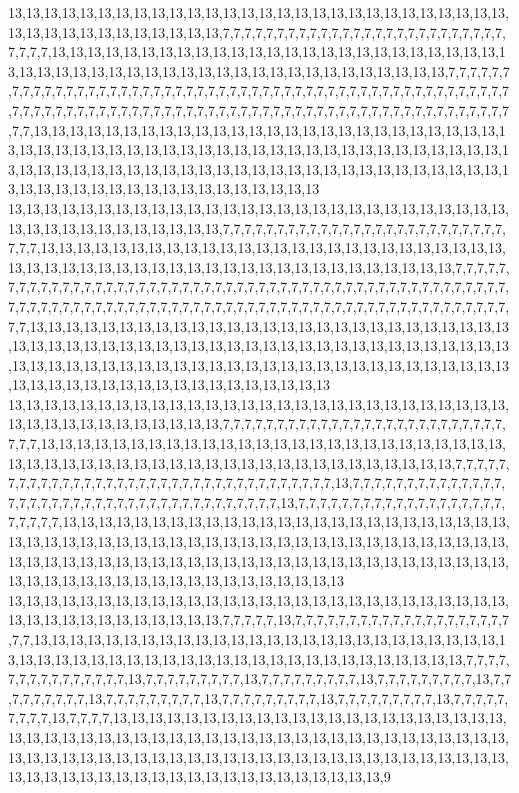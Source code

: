 13,13,13,13,13,13,13,13,13,13,13,13,13,13,13,13,13,13,13,13,13,13,13,13,13,13,13,13,13,13,13,13,13,13,13,13,13,13,13,13,7,7,7,7,7,7,7,7,7,7,7,7,7,7,7,7,7,7,7,7,7,7,7,7,7,7,7,7,7,7,13,13,13,13,13,13,13,13,13,13,13,13,13,13,13,13,13,13,13,13,13,13,13,13,13,13,13,13,13,13,13,13,13,13,13,13,13,13,13,13,13,13,13,13,13,13,13,13,13,13,7,7,7,7,7,7,7,7,7,7,7,7,7,7,7,7,7,7,7,7,7,7,7,7,7,7,7,7,7,7,7,7,7,7,7,7,7,7,7,7,7,7,7,7,7,7,7,7,7,7,7,7,7,7,7,7,7,7,7,7,7,7,7,7,7,7,7,7,7,7,7,7,7,7,7,7,7,7,7,7,7,7,7,7,7,7,7,7,7,7,7,7,7,7,7,7,7,7,7,7,13,13,13,13,13,13,13,13,13,13,13,13,13,13,13,13,13,13,13,13,13,13,13,13,13,13,13,13,13,13,13,13,13,13,13,13,13,13,13,13,13,13,13,13,13,13,13,13,13,13,13,13,13,13,13,13,13,13,13,13,13,13,13,13,13,13,13,13,13,13,13,13,13,13,13,13,13,13,13,13,13,13,13,13,13,13,13,13,13,13,13,13,13,13,13,13,13,13,13,13
13,13,13,13,13,13,13,13,13,13,13,13,13,13,13,13,13,13,13,13,13,13,13,13,13,13,13,13,13,13,13,13,13,13,13,13,13,13,13,13,7,7,7,7,7,7,7,7,7,7,7,7,7,7,7,7,7,7,7,7,7,7,7,7,7,7,7,7,7,13,13,13,13,13,13,13,13,13,13,13,13,13,13,13,13,13,13,13,13,13,13,13,13,13,13,13,13,13,13,13,13,13,13,13,13,13,13,13,13,13,13,13,13,13,13,13,13,13,13,13,7,7,7,7,7,7,7,7,7,7,7,7,7,7,7,7,7,7,7,7,7,7,7,7,7,7,7,7,7,7,7,7,7,7,7,7,7,7,7,7,7,7,7,7,7,7,7,7,7,7,7,7,7,7,7,7,7,7,7,7,7,7,7,7,7,7,7,7,7,7,7,7,7,7,7,7,7,7,7,7,7,7,7,7,7,7,7,7,7,7,7,7,7,7,7,7,7,7,7,13,13,13,13,13,13,13,13,13,13,13,13,13,13,13,13,13,13,13,13,13,13,13,13,13,13,13,13,13,13,13,13,13,13,13,13,13,13,13,13,13,13,13,13,13,13,13,13,13,13,13,13,13,13,13,13,13,13,13,13,13,13,13,13,13,13,13,13,13,13,13,13,13,13,13,13,13,13,13,13,13,13,13,13,13,13,13,13,13,13,13,13,13,13,13,13,13,13,13,13,13
13,13,13,13,13,13,13,13,13,13,13,13,13,13,13,13,13,13,13,13,13,13,13,13,13,13,13,13,13,13,13,13,13,13,13,13,13,13,13,13,7,7,7,7,7,7,7,7,7,7,7,7,7,7,7,7,7,7,7,7,7,7,7,7,7,7,7,7,7,13,13,13,13,13,13,13,13,13,13,13,13,13,13,13,13,13,13,13,13,13,13,13,13,13,13,13,13,13,13,13,13,13,13,13,13,13,13,13,13,13,13,13,13,13,13,13,13,13,13,13,7,7,7,7,7,7,7,7,7,7,7,7,7,7,7,7,7,7,7,7,7,7,7,7,7,7,7,7,7,7,7,7,7,7,7,13,7,7,7,7,7,7,7,7,7,7,7,7,7,7,7,7,7,7,7,7,7,7,7,7,7,7,7,7,7,7,7,7,7,7,7,7,7,7,7,13,7,7,7,7,7,7,7,7,7,7,7,7,7,7,7,7,7,7,7,7,7,7,7,7,13,13,13,13,13,13,13,13,13,13,13,13,13,13,13,13,13,13,13,13,13,13,13,13,13,13,13,13,13,13,13,13,13,13,13,13,13,13,13,13,13,13,13,13,13,13,13,13,13,13,13,13,13,13,13,13,13,13,13,13,13,13,13,13,13,13,13,13,13,13,13,13,13,13,13,13,13,13,13,13,13,13,13,13,13,13,13,13,13,13,13,13,13,13,13,13,13,13,13,13
13,13,13,13,13,13,13,13,13,13,13,13,13,13,13,13,13,13,13,13,13,13,13,13,13,13,13,13,13,13,13,13,13,13,13,13,13,13,13,13,7,7,7,7,7,13,7,7,7,7,7,7,7,7,7,7,7,7,7,7,7,7,7,7,7,7,7,7,13,13,13,13,13,13,13,13,13,13,13,13,13,13,13,13,13,13,13,13,13,13,13,13,13,13,13,13,13,13,13,13,13,13,13,13,13,13,13,13,13,13,13,13,13,13,13,13,13,13,13,13,7,7,7,7,7,7,7,7,7,7,7,7,7,7,7,13,7,7,7,7,7,7,7,7,7,13,7,7,7,7,7,7,7,7,7,13,7,7,7,7,7,7,7,7,7,13,7,7,7,7,7,7,7,7,7,13,7,7,7,7,7,7,7,7,7,13,7,7,7,7,7,7,7,7,7,13,7,7,7,7,7,7,7,7,7,13,7,7,7,7,7,7,7,7,7,13,7,7,7,7,13,13,13,13,13,13,13,13,13,13,13,13,13,13,13,13,13,13,13,13,13,13,13,13,13,13,13,13,13,13,13,13,13,13,13,13,13,13,13,13,13,13,13,13,13,13,13,13,13,13,13,13,13,13,13,13,13,13,13,13,13,13,13,13,13,13,13,13,13,13,13,13,13,13,13,13,13,13,13,13,13,13,13,13,13,13,13,13,13,13,13,13,13,13,13,13,13,13,13,9
